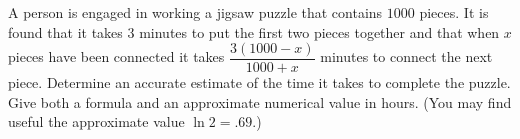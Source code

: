 A person is engaged in working a jigsaw puzzle that contains $1000$ pieces. It
is found that it takes $3$ minutes to put the first two pieces together and
that when $x$ pieces have been connected it takes $\dfrac{3(1000 - x)}{1000 +
x}$ minutes to connect the next piece. Determine an accurate estimate of the
time it takes to complete the puzzle. Give both a formula and an approximate
numerical value in hours. (You may find useful the approximate value $\ln 2 =
.69$.)
